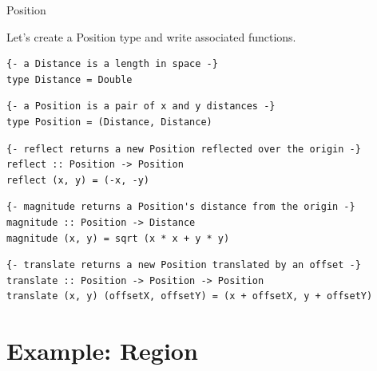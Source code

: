 \documentclass[8pt,aspectratio=169]{beamer}
\begin{document}
\begin{frame}[fragile]{Position}

Let's create a Position type and write associated functions.
\newline

\pause
\begin{verbatim}
{- a Distance is a length in space -}
type Distance = Double
\end{verbatim}

\pause
\begin{verbatim}
{- a Position is a pair of x and y distances -}
type Position = (Distance, Distance)
\end{verbatim}

\pause
\begin{verbatim}
{- reflect returns a new Position reflected over the origin -}
reflect :: Position -> Position
reflect (x, y) = (-x, -y)
\end{verbatim}

\pause
\begin{verbatim}
{- magnitude returns a Position's distance from the origin -}
magnitude :: Position -> Distance
magnitude (x, y) = sqrt (x * x + y * y)
\end{verbatim}

\pause
\begin{verbatim}
{- translate returns a new Position translated by an offset -}
translate :: Position -> Position -> Position
translate (x, y) (offsetX, offsetY) = (x + offsetX, y + offsetY)
\end{verbatim}

\end{frame}


\section{Example: Region}

\end{document}
